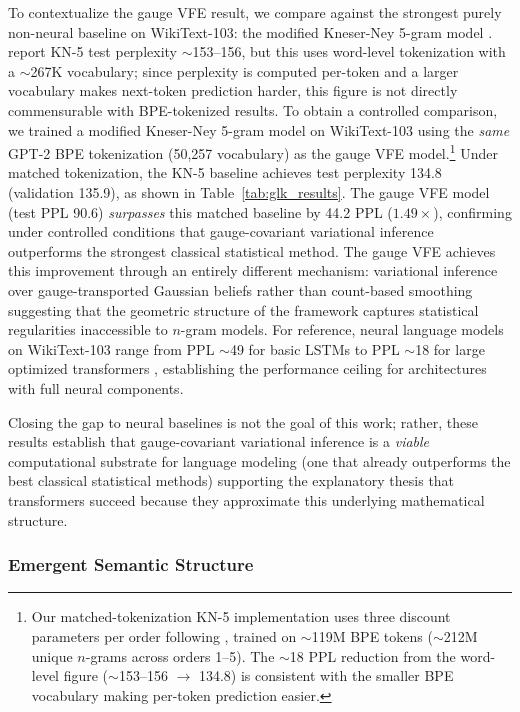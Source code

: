 \documentclass[twoside,11pt]{article}
\begin{document}
To contextualize the gauge VFE result, we compare against the strongest purely non-neural baseline on WikiText-103: the modified Kneser-Ney 5-gram model \citep{chen1998empirical}. \citet{merity2017pointer} report KN-5 test perplexity $\sim$153--156, but this uses word-level tokenization with a $\sim$267K vocabulary; since perplexity is computed per-token and a larger vocabulary makes next-token prediction harder, this figure is not directly commensurable with BPE-tokenized results. To obtain a controlled comparison, we trained a modified Kneser-Ney 5-gram model on WikiText-103 using the \emph{same} GPT-2 BPE tokenization (50{,}257 vocabulary) as the gauge VFE model.\footnote{Our matched-tokenization KN-5 implementation uses three discount parameters per order following \citet{chen1998empirical}, trained on $\sim$119M BPE tokens ($\sim$212M unique $n$-grams across orders 1--5). The $\sim$18 PPL reduction from the word-level figure ($\sim$153--156 $\to$ 134.8) is consistent with the smaller BPE vocabulary making per-token prediction easier.} Under matched tokenization, the KN-5 baseline achieves test perplexity 134.8 (validation 135.9), as shown in Table~\ref{tab:glk_results}. The gauge VFE model (test PPL 90.6) \emph{surpasses} this matched baseline by 44.2 PPL ($1.49\times$), confirming under controlled conditions that gauge-covariant variational inference outperforms the strongest classical statistical method. The gauge VFE achieves this improvement through an entirely different mechanism: variational inference over gauge-transported Gaussian beliefs rather than count-based smoothing suggesting that the geometric structure of the framework captures statistical regularities inaccessible to $n$-gram models. For reference, neural language models on WikiText-103 range from PPL $\sim$49 for basic LSTMs \citep{grave2017improving} to PPL $\sim$18 for large optimized transformers \citep{dai2019transformerxl}, establishing the performance ceiling for architectures with full neural components.

Closing the gap to neural baselines is not the goal of this work; rather, these results establish that gauge-covariant variational inference is a \emph{viable} computational substrate for language modeling (one that already outperforms the best classical statistical methods) supporting the explanatory thesis that transformers succeed because they approximate this underlying mathematical structure.

\subsubsection{Emergent Semantic Structure}
\end{document}
